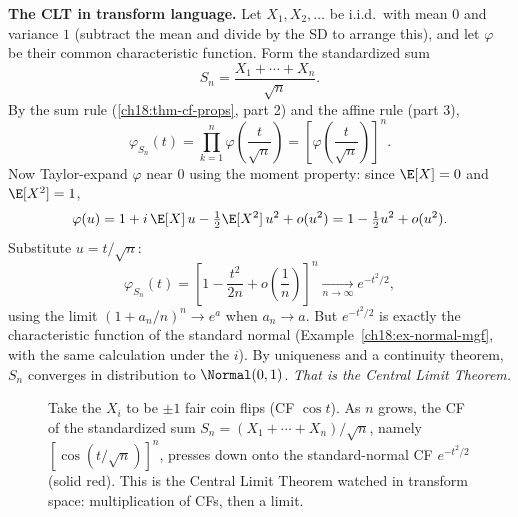 \begin{focusbox}
\textbf{The CLT in transform language.} Let $X_1,X_2,\dots$ be i.i.d.\ with mean
$0$ and variance $1$ (subtract the mean and divide by the SD to arrange this),
and let $\varphi$ be their common characteristic function. Form the standardized
sum
\[
  S_n = \frac{X_1+\cdots+X_n}{\sqrt n}.
\]
By the sum rule (\ref{ch18:thm-cf-props}, part 2) and the affine rule (part 3),
\[
  \varphi_{S_n}(t)
   = \prod_{k=1}^n \varphi\!\left(\frac{t}{\sqrt n}\right)
   = \left[\varphi\!\left(\frac{t}{\sqrt n}\right)\right]^n .
\]
Now Taylor-expand $\varphi$ near $0$ using the moment property: since $\E[X]=0$
and $\E[X^2]=1$,
\[
  \varphi(u) = 1 + i\,\E[X]\,u - \tfrac12 \E[X^2]\,u^2 + o(u^2)
             = 1 - \tfrac12 u^2 + o(u^2).
\]
Substitute $u=t/\sqrt n$:
\[
  \varphi_{S_n}(t)
   = \left[1 - \frac{t^2}{2n} + o\!\left(\frac{1}{n}\right)\right]^n
   \xrightarrow[n\to\infty]{} e^{-t^2/2},
\]
using the limit $(1+a_n/n)^n\to e^a$ when $a_n\to a$. But $e^{-t^2/2}$ is
exactly the characteristic function of the standard normal
(Example~\ref{ch18:ex-normal-mgf}, with the same calculation under the $i$). By
uniqueness and a continuity theorem, $S_n$ converges in distribution to
$\Normal(0,1)$. \emph{That is the Central Limit Theorem.}
\end{focusbox}

\begin{figure}[H]
\centering
{}
\caption{Take the $X_i$ to be $\pm1$ fair coin flips (CF $\cos t$). As $n$ grows,
the CF of the standardized sum $S_n=(X_1+\cdots+X_n)/\sqrt n$, namely
$[\cos(t/\sqrt n)]^n$, presses down onto the standard-normal CF $e^{-t^2/2}$
(solid red). This is the Central Limit Theorem watched in transform space:
multiplication of CFs, then a limit.}
\label{ch18:fig-clt}
\end{figure}


